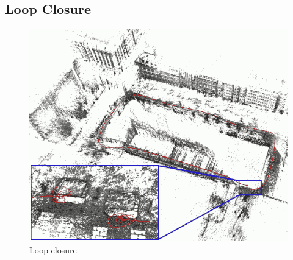 \subsection{Loop Closure}%
\label{sub:loop-closure}

\begin{figure}[ht]
	\centering
	\includegraphics[width=\linewidth]{assets/img/loop-closure-lowres.png}
	\caption{Loop closure}%
	\label{fig:loop-closure}
\end{figure}
